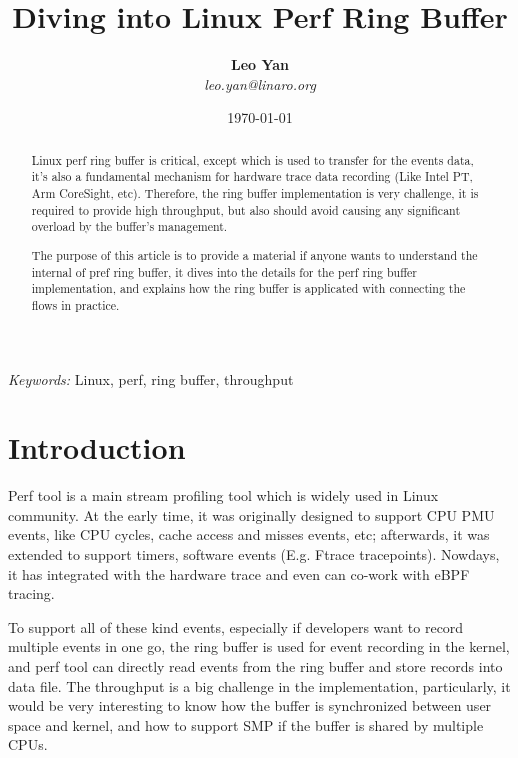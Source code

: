 \documentclass[11pt]{diazessay} %
\title{\textbf{Diving into Linux Perf Ring Buffer}}
\author{\textbf{Leo Yan} \\ \textit{leo.yan@linaro.org}} %
\date{\today} %
\begin{document}
\maketitle %


\begin{abstract}
Linux perf ring buffer is critical, except which is used to transfer for the events data, it's also a fundamental mechanism for hardware trace data recording (Like Intel PT, Arm CoreSight, etc).  Therefore, the ring buffer implementation is very challenge, it is required to provide high throughput, but also should avoid causing any significant overload by the buffer's management.

The purpose of this article is to provide a material if anyone wants to understand the internal of pref ring buffer, it dives into the details for the perf ring buffer implementation, and explains how the ring buffer is applicated with connecting the flows in practice.
\end{abstract}

\hspace*{3.6mm}\textit{Keywords:} Linux, perf, ring buffer, throughput %
\vspace{30pt} %


\section*{Introduction}

Perf tool is a main stream profiling tool which is widely used in Linux community.  At the early time, it was originally designed to support CPU PMU events, like CPU cycles, cache access and misses events, etc; afterwards, it was extended to support timers, software events (E.g. Ftrace tracepoints).  Nowdays, it has integrated with the hardware trace and even can co-work with eBPF tracing.

To support all of these kind events, especially if developers want to record multiple events in one go, the ring buffer is used for event recording in the kernel, and perf tool can directly read events from the ring buffer and store records into data file.  The throughput is a big challenge in the implementation, particularly, it would be very interesting to know how the buffer is synchronized between user space and kernel, and how to support SMP if the buffer is shared by multiple CPUs.
\end{document}

